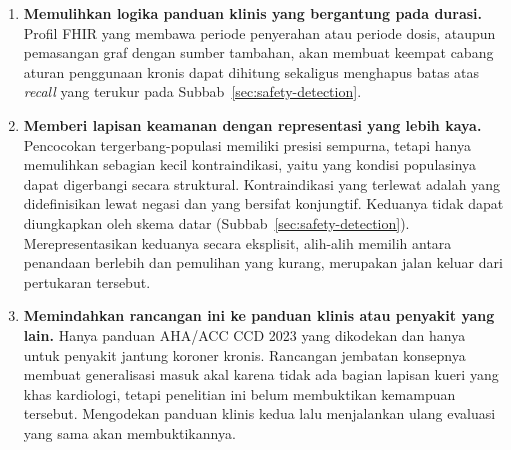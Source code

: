 \begin{enumerate}
    \item \textbf{Memulihkan logika panduan klinis yang bergantung pada durasi.} Profil FHIR yang
    membawa periode penyerahan atau periode dosis, ataupun pemasangan graf dengan sumber
    tambahan, akan membuat keempat cabang aturan penggunaan kronis dapat dihitung sekaligus
    menghapus batas atas \emph{recall} yang terukur pada
    Subbab~\ref{sec:safety-detection}.

    \item \textbf{Memberi lapisan keamanan dengan representasi yang lebih kaya.} Pencocokan tergerbang-populasi memiliki presisi sempurna, tetapi hanya memulihkan sebagian
    kecil kontraindikasi, yaitu yang kondisi populasinya dapat digerbangi secara struktural.
    Kontraindikasi yang terlewat adalah yang didefinisikan lewat negasi dan yang bersifat
    konjungtif. Keduanya tidak dapat diungkapkan oleh skema datar
    (Subbab~\ref{sec:safety-detection}). Merepresentasikan keduanya secara eksplisit,
    alih-alih memilih antara penandaan berlebih dan pemulihan yang kurang, merupakan jalan
    keluar dari pertukaran tersebut.

    \item \textbf{Memindahkan rancangan ini ke panduan klinis atau penyakit yang lain.} Hanya
    panduan AHA/ACC CCD 2023 yang dikodekan dan hanya untuk penyakit jantung koroner
    kronis. Rancangan jembatan konsepnya membuat generalisasi masuk akal karena tidak ada
    bagian lapisan kueri yang khas kardiologi, tetapi penelitian ini belum membuktikan kemampuan tersebut.
    Mengodekan panduan klinis kedua lalu menjalankan ulang evaluasi yang sama akan
    membuktikannya.
\end{enumerate}
